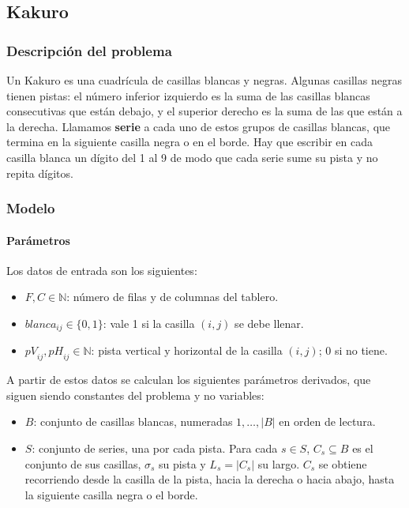 \subsection{Kakuro}

\subsubsection{Descripción del problema}

Un Kakuro es una cuadrícula de casillas blancas y negras. Algunas casillas negras tienen pistas: el número inferior izquierdo es la suma de las casillas blancas consecutivas que están debajo, y el superior derecho es la suma de las que están a la derecha. Llamamos \textbf{serie} a cada uno de estos grupos de casillas blancas, que termina en la siguiente casilla negra o en el borde. Hay que escribir en cada casilla blanca un dígito del 1 al 9 de modo que cada serie sume su pista y no repita dígitos.

\subsubsection{Modelo}

\paragraph{Parámetros}

Los datos de entrada son los siguientes:

\begin{itemize}
    \item $F, C \in \mathbb{N}$: número de filas y de columnas del tablero.
    \item $\mathit{blanca}_{ij} \in \{0, 1\}$: vale 1 si la casilla $(i, j)$ se debe llenar.
    \item $\mathit{pV}_{ij}, \mathit{pH}_{ij} \in \mathbb{N}$: pista vertical y horizontal de la casilla $(i, j)$; 0 si no tiene.
\end{itemize}

A partir de estos datos se calculan los siguientes parámetros derivados, que siguen siendo constantes del problema y no variables:

\begin{itemize}
    \item $B$: conjunto de casillas blancas, numeradas $1, \dots, |B|$ en orden de lectura.
    \item $S$: conjunto de series, una por cada pista. Para cada $s \in S$, $C_s \subseteq B$ es el conjunto de sus casillas, $\sigma_s$ su pista y $L_s = |C_s|$ su largo. $C_s$ se obtiene recorriendo desde la casilla de la pista, hacia la derecha o hacia abajo, hasta la siguiente casilla negra o el borde.
\end{itemize}

